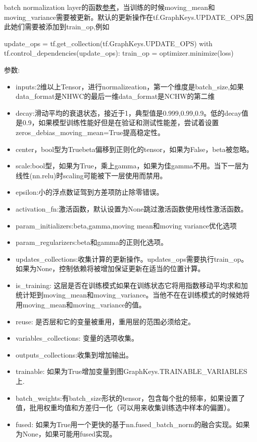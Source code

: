 batch normalization layer的函数\href{https://arxiv.org/pdf/1502.03167.pdf}{参考}，当训练的时候moving\_mean和moving\_variance需要被更新。默认的更新操作在tf.GraphKeys.UPDATE\_OPS,因此她们需要被添加到train\_op,例如
\begin{python}
  update_ops = tf.get_collection(tf.GraphKeys.UPDATE_OPS)
  with tf.control_dependencies(update_ops):
    train_op = optimizer.minimize(loss)
\end{python}
参数:
\begin{itemize}
	\item inputs:2维以上Tensor，进行normalizeation，第一个维度是batch\_size,如果data\_format是NHWC的最后一维data\_format是NCHW的第二维
	\item decay:滑动平均的衰退状态，接近于1，典型值是0.999,0.99,0.9。低的decay值是0.9，如果模型训练性能好但是在验证和测试性能差，尝试着设置zeros\_debias\_moving\_mean=True提高稳定性。
	\item center，bool型为Truebeta偏移到正则化的tensor，如果为False，beta被忽略。
	\item scale:bool型，如果为True，乘上gamma，如果为佳gamma不用。当下一层为线性(nn.relu)时scaling可能被下一层使用而禁用。
	\item epsilon:小的浮点数证驾到方差项防止除零错误。
	\item activation\_fn:激活函数，默认设置为None跳过激活函数使用线性激活函数。
	\item param\_initializers:beta,gamma,moving mean和moving variance优化选项
	\item param\_regularizers:beta和gamma的正则化选项。
	\item  updates\_collections:收集计算的更新操作。updates\_ops需要执行train\_op。如果为None，控制依赖将被增加保证更新在适当的位置计算。
	\item is\_training: 这层是否在训练模式如果在训练状态它将用指数移动平均求和加统计矩到moving\_mean和moving\_variance。当他不在在训练模式的时候她将用moving\_mean和moving\_variance的值。
	\item reuse: 是否层和它的变量被重用，重用层的范围必须给定。
	\item variables\_collections: 变量的选项收集。
	\item outputs\_collections:收集到增加输出。
	\item trainable: 如果为True增加变量到图GraphKeys.TRAINABLE\_VARIABLES上.
	\item batch\_weights:有batch\_size形状的tensor，包含每个批的频率，如果设置了值，批用权重均值和方差归一化（可以用来收集训练选中样本的偏置）。
	\item fused: 如果为True用一个更快的基于nn.fused\_batch\_norm的融合实现。如果为None，如果可能用fused实现。

\end{itemize}

